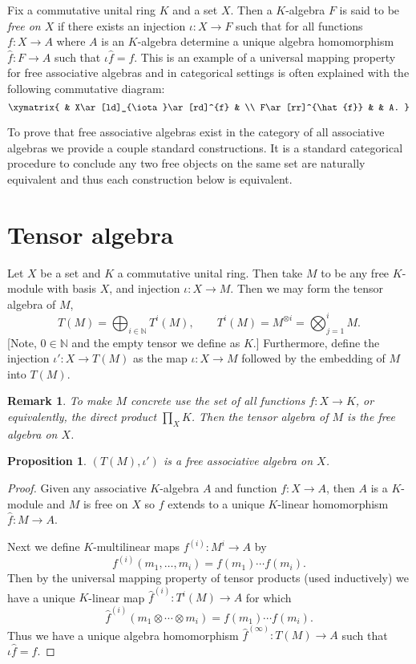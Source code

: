 \documentclass[12pt]{article}
\newtheorem{prop}[thm]{Proposition}
\newtheorem{remark}[thm]{Remark}
\begin{document}
Fix a commutative unital ring $K$ and a set $X$.  Then a $K$-algebra $F$ is
said to be \emph{free on $X$} if there exists an injection $\iota:X\rightarrow F$ such that for all functions $f:X\rightarrow A$ where $A$ is an $K$-algebra
determine a unique algebra homomorphism $\hat{f}:F\rightarrow A$ such that
$\iota\hat{f}=f$.  This is an example of a universal mapping property for
free associative algebras and in categorical settings is often explained
with the following commutative diagram:
\[\xymatrix{
  &  X\ar[ld]_{\iota}\ar[rd]^{f} & \\
F\ar[rr]^{\hat{f}} & & A.
}\]

To prove that free associative algebras exist in the category of all
associative algebras we provide a couple standard constructions.  It
is a standard categorical procedure to conclude any two free objects
on the same set are naturally equivalent and thus each construction
below is equivalent.

\section{Tensor algebra}

Let $X$ be a set and $K$ a commutative unital ring.  Then take $M$ to be
any free $K$-module with basis $X$, and injection $\iota:X\rightarrow M$.  
Then we may form the tensor algebra of $M$, 
   \[T(M)=\bigoplus_{i\in\mathbb{N}} T^i(M),\qquad 
                T^i(M)=M^{\otimes i}= \bigotimes_{j=1}^i M.\]
[Note, $0\in\mathbb{N}$ and the empty tensor we define as $K$.]
Furthermore, define the injection $\iota':X\rightarrow T(M)$ as the map $\iota:X\rightarrow M$ followed by the embedding of $M$ into $T(M)$.

\begin{remark}
To make $M$ concrete use the set of all functions $f:X\rightarrow K$, or 
equivalently, the direct product $\prod_{X} K$.  Then the tensor algebra
of $M$ is the free algebra on $X$.
\end{remark}

\begin{prop}
$(T(M),\iota')$ is a free associative algebra on $X$.
\end{prop}
\begin{proof}
Given any associative $K$-algebra $A$ and function $f:X\rightarrow A$, then 
$A$ is a $K$-module and $M$ is free on $X$ so $f$ extends to a unique 
$K$-linear homomorphism $\hat{f}:M\rightarrow A$.  

Next we define $K$-multilinear maps $f^{(i)}:M^i\rightarrow A$ by 
   \[f^{(i)}(m_1,\dots,m_i)=f(m_1)\cdots f(m_i).\]
Then by the universal mapping property of tensor products (used inductively)
we have a unique $K$-linear map $\hat{f}^{(i)}:T^i(M)\rightarrow A$ for which
   \[\hat{f}^{(i)}(m_1\otimes\cdots\otimes m_i)=f(m_1)\cdots f(m_i).\]
Thus we have a unique algebra homomorphism 
$\hat{f}^{(\infty)}:T(M)\rightarrow A$ such that $\iota\hat{f}=f$.
\end{proof}
\end{document}
